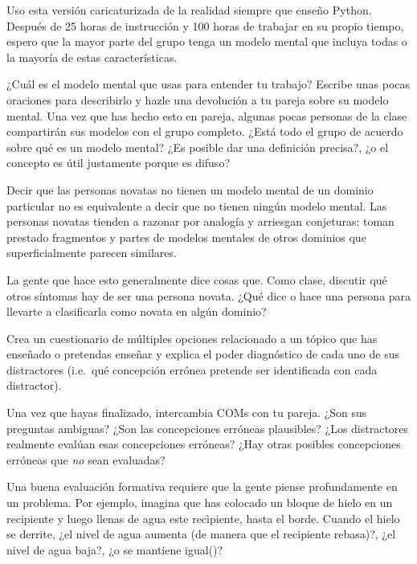 Uso esta versión caricaturizada de la realidad siempre que enseño Python.
Después de 25 horas de instrucción y 100 horas de trabajar en su propio tiempo,
espero que la mayor parte del grupo tenga un modelo mental
que incluya todas o la mayoría de estas características.



¿Cuál es el modelo mental que usas para entender tu trabajo?
Escribe unas pocas oraciones para describirlo y hazle una devolución a tu pareja sobre su modelo mental.
Una vez que has hecho esto en pareja,
algunas pocas personas de la clase compartirán sus modelos con el grupo completo.
¿Está todo el grupo de acuerdo sobre qué es un modelo mental?
¿Es posible dar una definición precisa?,
¿o el concepto es útil justamente porque es difuso?

Decir que las personas novatas no tienen un modelo mental de un dominio particular
no es equivalente a decir que no tienen ningún modelo mental.
Las personas novatas tienden a razonar por analogía y arriesgan conjeturas:
toman prestado fragmentos y partes de modelos mentales de otros dominios que superficialmente parecen similares.

La gente que hace esto generalmente dice cosas que.
Como clase,
discutir qué otros síntomas hay de ser una persona novata.
¿Qué dice o hace una persona para llevarte a clasificarla como novata en algún dominio?

Crea un cuestionario de múltiples opciones relacionado a un tópico que has enseñado o pretendas enseñar
y explica el poder diagnóstico de cada uno de sus distractores
(i.e.\ qué concepción errónea pretende ser identificada con cada distractor).

Una vez que hayas finalizado, intercambia COMs con tu pareja.
¿Son sus preguntas ambiguas?
¿Son las concepciones erróneas plausibles?
¿Los distractores realmente evalúan esas concepciones erróneas?
¿Hay otras posibles concepciones erróneas que \emph{no} sean evaluadas?

Una buena evaluación formativa requiere que la gente piense profundamente en un problema.
Por ejemplo,
imagina que has colocado un bloque de hielo en un recipiente y luego llenas de agua este recìpiente, hasta el borde.
Cuando el hielo se derrite, ¿el nivel de agua aumenta (de manera que el recipiente rebasa)?, ¿el nivel de agua baja?, ¿o se mantiene igual()?


